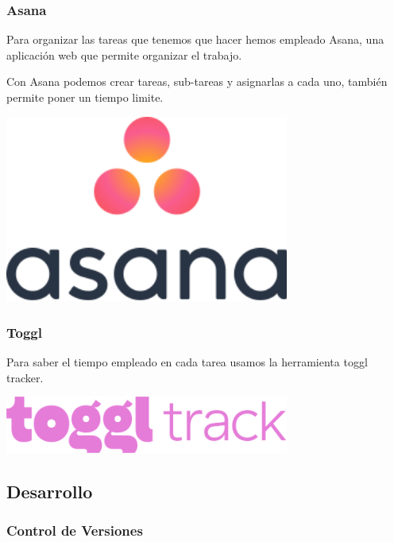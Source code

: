 \documentclass[12pt,a4paper]{article}
\begin{document}
\subsubsection{Asana}


\begin{minipage}{.75\textwidth}
Para organizar las tareas que tenemos que hacer hemos empleado Asana, una aplicación web que permite organizar el trabajo.


Con Asana podemos crear tareas, sub-tareas y asignarlas a cada uno, también permite poner un tiempo limite. 
\end{minipage} %
\begin{minipage}{.25\textwidth}
  \includegraphics[width=0.7\textwidth, right]{asana}
\end{minipage}


\subsubsection{Toggl}

\begin{minipage}{.75\textwidth}
Para saber el tiempo empleado en cada tarea usamos la herramienta toggl tracker.
\end{minipage} %
\begin{minipage}{.25\textwidth}
  \includegraphics[width=0.7\textwidth, right]{toggl}
\end{minipage}

\subsection{Desarrollo}

\subsubsection{Control de Versiones}
\end{document}
